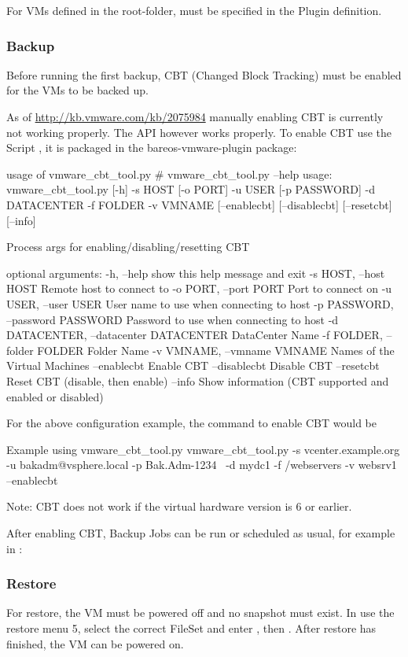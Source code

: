For VMs defined in the root-folder,  must be specified
in the Plugin definition.

\subsubsection{Backup}

Before running the first backup, CBT (Changed Block Tracking) must be
enabled for the VMs to be backed up.

As of \url{http://kb.vmware.com/kb/2075984} manually enabling CBT is
currently not working properly. The API however works properly.
To enable CBT use the Script , it is packaged
in the bareos-vmware-plugin package:

\begin{commands}{usage of vmware\_cbt\_tool.py}
# vmware_cbt_tool.py --help
usage: vmware_cbt_tool.py [-h] -s HOST [-o PORT] -u USER [-p PASSWORD] -d
                          DATACENTER -f FOLDER -v VMNAME [--enablecbt]
                          [--disablecbt] [--resetcbt] [--info]

Process args for enabling/disabling/resetting CBT

optional arguments:
  -h, --help            show this help message and exit
  -s HOST, --host HOST  Remote host to connect to
  -o PORT, --port PORT  Port to connect on
  -u USER, --user USER  User name to use when connecting to host
  -p PASSWORD, --password PASSWORD
                        Password to use when connecting to host
  -d DATACENTER, --datacenter DATACENTER
                        DataCenter Name
  -f FOLDER, --folder FOLDER
                        Folder Name
  -v VMNAME, --vmname VMNAME
                        Names of the Virtual Machines
  --enablecbt           Enable CBT
  --disablecbt          Disable CBT
  --resetcbt            Reset CBT (disable, then enable)
  --info                Show information (CBT supported and enabled or
                        disabled)
\end{commands}

For the above configuration example, the command to enable CBT would be

\begin{commands}{Example using vmware\_cbt\_tool.py}
vmware_cbt_tool.py -s vcenter.example.org -u bakadm@vsphere.local -p Bak.Adm-1234 \
  -d mydc1 -f /webservers -v websrv1 --enablecbt
\end{commands}

Note: CBT does not work if the virtual hardware version is 6 or earlier.

After enabling CBT, Backup Jobs can be run or scheduled as usual,
for example in \command{bconsole}:


\subsubsection{Restore}

For restore, the VM must be powered off and no snapshot must exist.
In \command{bconsole} use the restore menu 5, select the correct FileSet
and enter \command{mark *}, then \command{done}. After restore has finished,
the VM can be powered on.
